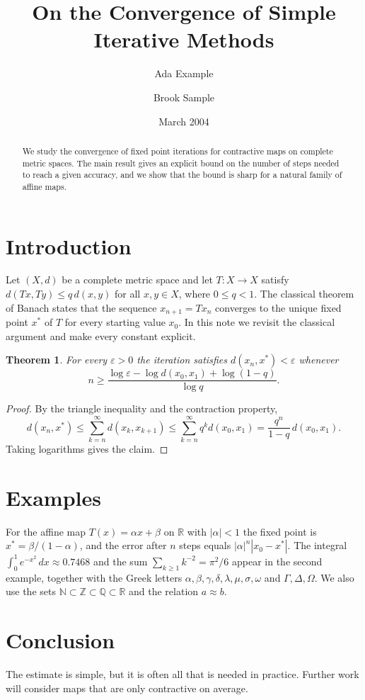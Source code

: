 \documentclass[11pt]{article}
\title{On the Convergence of Simple Iterative Methods}
\author{Ada Example \and Brook Sample}
\date{March 2004}
\newtheorem{theorem}{Theorem}
\begin{document}
\maketitle
\begin{abstract}
We study the convergence of fixed point iterations for contractive maps on complete metric spaces.
The main result gives an explicit bound on the number of steps needed to reach a given accuracy,
and we show that the bound is sharp for a natural family of affine maps.
\end{abstract}
\section{Introduction}
Let $(X,d)$ be a complete metric space and let $T\colon X\to X$ satisfy
$d(Tx,Ty)\le q\,d(x,y)$ for all $x,y\in X$, where $0\le q<1$. The classical theorem of Banach states
that the sequence $x_{n+1}=Tx_n$ converges to the unique fixed point $x^\ast$ of $T$ for every starting value $x_0$.
In this note we revisit the classical argument and make every constant explicit.
\begin{theorem}
For every $\varepsilon>0$ the iteration satisfies $d(x_n,x^\ast)<\varepsilon$ whenever
\begin{equation}
n \ge \frac{\log\varepsilon - \log d(x_0,x_1) + \log(1-q)}{\log q}.
\end{equation}
\end{theorem}
\begin{proof}
By the triangle inequality and the contraction property,
\[
d(x_n,x^\ast)\le\sum_{k=n}^{\infty} d(x_k,x_{k+1})\le \sum_{k=n}^{\infty} q^k d(x_0,x_1)=\frac{q^n}{1-q}\,d(x_0,x_1).
\]
Taking logarithms gives the claim.
\end{proof}
\section{Examples}
For the affine map $T(x)=\alpha x+\beta$ on $\mathbb{R}$ with $|\alpha|<1$ the fixed point is
$x^\ast=\beta/(1-\alpha)$, and the error after $n$ steps equals $|\alpha|^n|x_0-x^\ast|$.
The integral $\int_0^1 e^{-x^2}\,dx\approx 0.7468$ and the sum $\sum_{k\ge1} k^{-2}=\pi^2/6$ appear in the
second example, together with the Greek letters $\alpha,\beta,\gamma,\delta,\lambda,\mu,\sigma,\omega$ and $\Gamma,\Delta,\Omega$.
We also use the sets $\mathbb{N}\subset\mathbb{Z}\subset\mathbb{Q}\subset\mathbb{R}$ and the relation $a\approx b$.
\section{Conclusion}
The estimate is simple, but it is often all that is needed in practice. Further work will consider
maps that are only contractive on average.
\end{document}
